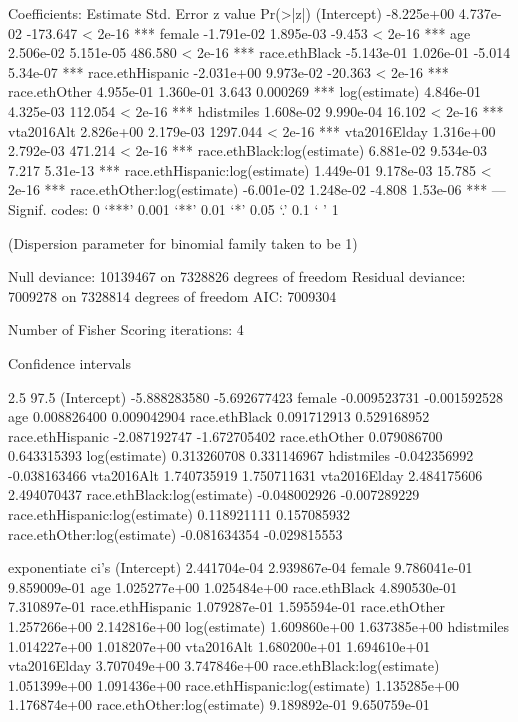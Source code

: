 Coefficients:
                                 Estimate Std. Error  z value Pr(>|z|)
(Intercept)                    -8.225e+00  4.737e-02 -173.647  < 2e-16 ***
female                         -1.791e-02  1.895e-03   -9.453  < 2e-16 ***
age                             2.506e-02  5.151e-05  486.580  < 2e-16 ***
race.ethBlack                  -5.143e-01  1.026e-01   -5.014 5.34e-07 ***
race.ethHispanic               -2.031e+00  9.973e-02  -20.363  < 2e-16 ***
race.ethOther                   4.955e-01  1.360e-01    3.643 0.000269 ***
log(estimate)                   4.846e-01  4.325e-03  112.054  < 2e-16 ***
hdistmiles                      1.608e-02  9.990e-04   16.102  < 2e-16 ***
vta2016Alt                      2.826e+00  2.179e-03 1297.044  < 2e-16 ***
vta2016Elday                    1.316e+00  2.792e-03  471.214  < 2e-16 ***
race.ethBlack:log(estimate)     6.881e-02  9.534e-03    7.217 5.31e-13 ***
race.ethHispanic:log(estimate)  1.449e-01  9.178e-03   15.785  < 2e-16 ***
race.ethOther:log(estimate)    -6.001e-02  1.248e-02   -4.808 1.53e-06 ***
---
Signif. codes:  0 ‘***’ 0.001 ‘**’ 0.01 ‘*’ 0.05 ‘.’ 0.1 ‘ ’ 1

(Dispersion parameter for binomial family taken to be 1)

    Null deviance: 10139467  on 7328826  degrees of freedom
Residual deviance:  7009278  on 7328814  degrees of freedom
AIC: 7009304

Number of Fisher Scoring iterations: 4


Confidence intervals

                                    2.5        97.5 %
(Intercept)                    -5.888283580 -5.692677423
female                         -0.009523731 -0.001592528
age                             0.008826400  0.009042904
race.ethBlack                   0.091712913  0.529168952
race.ethHispanic               -2.087192747 -1.672705402
race.ethOther                   0.079086700  0.643315393
log(estimate)                   0.313260708  0.331146967
hdistmiles                     -0.042356992 -0.038163466
vta2016Alt                      1.740735919  1.750711631
vta2016Elday                    2.484175606  2.494070437
race.ethBlack:log(estimate)    -0.048002926 -0.007289229
race.ethHispanic:log(estimate)  0.118921111  0.157085932
race.ethOther:log(estimate)    -0.081634354 -0.029815553

exponentiate ci's
(Intercept)                    2.441704e-04 2.939867e-04
female                         9.786041e-01 9.859009e-01
age                            1.025277e+00 1.025484e+00
race.ethBlack                  4.890530e-01 7.310897e-01
race.ethHispanic               1.079287e-01 1.595594e-01
race.ethOther                  1.257266e+00 2.142816e+00
log(estimate)                  1.609860e+00 1.637385e+00
hdistmiles                     1.014227e+00 1.018207e+00
vta2016Alt                     1.680200e+01 1.694610e+01
vta2016Elday                   3.707049e+00 3.747846e+00
race.ethBlack:log(estimate)    1.051399e+00 1.091436e+00
race.ethHispanic:log(estimate) 1.135285e+00 1.176874e+00
race.ethOther:log(estimate)    9.189892e-01 9.650759e-01



